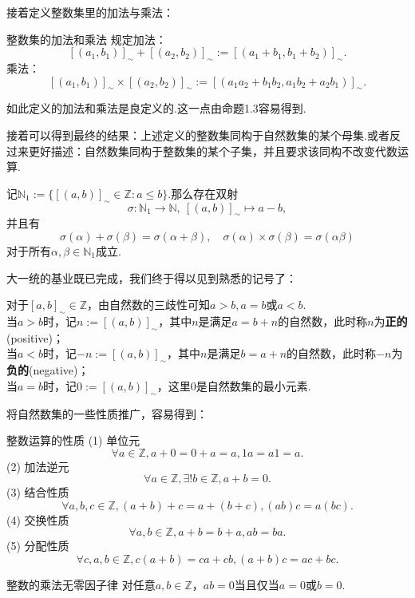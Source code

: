 \documentclass[lang=cn, zihao=5]{elegantbook}
\newcommand{\Z}{\mathbb{Z}}
\begin{document}
接着定义整数集里的加法与乘法：

\begin{definition}{整数集的加法和乘法}
	规定加法：$$[(a_1,b_1)]_{\sim} + [(a_2,b_2)]_{\sim} := [(a_1+b_1,b_1+b_2)]_{\sim}.$$
	乘法：
	$$[(a_1,b_1)]_{\sim} \times [(a_2,b_2)]_{\sim} := [(a_1a_2+b_1b_2,a_1b_2+a_2b_1)]_{\sim}.$$
\end{definition}

如此定义的加法和乘法是良定义的.这一点由命题1.3容易得到.

接着可以得到最终的结果：上述定义的整数集同构于自然数集的某个母集.或者反过来更好描述：自然数集同构于整数集的某个子集，并且要求该同构不改变代数运算.

\begin{proposition}
	记$\mathbb{N}_1:=\{ [(a,b)]_{\sim} \in \mathbb{Z}:a \leq b \}$.那么存在双射$$\sigma :\mathbb{N}_1 \to \mathbb{N},~[(a,b)]_{\sim} \mapsto a-b,$$
	并且有$$\sigma (\alpha) + \sigma (\beta) = \sigma (\alpha + \beta),\quad \sigma (\alpha) \times \sigma (\beta) = \sigma (\alpha  \beta)$$
	对于所有$\alpha ,\beta \in \mathbb{N}_1$成立.
\end{proposition}

大一统的基业既已完成，我们终于得以见到熟悉的记号了：

\begin{definition}
	对于$[a,b]_{\sim} \in \mathbb{Z}$，由自然数的三歧性可知$a>b,a=b$或$a<b$. \\
	当$a>b$时，记$n:=[(a,b)]_{\sim}$，其中$n$是满足$a=b+n$的自然数，此时称$n$为\textbf{正的}(positive)； \\
	当$a<b$时，记$-n:=[(a,b)]_{\sim}$，其中$n$是满足$b=a+n$的自然数，此时称$-n$为\textbf{负的}(negative)； \\
	当$a=b$时，记$0:=[(a,b)]_{\sim}$，这里$0$是自然数集的最小元素.
\end{definition}

将自然数集的一些性质推广，容易得到：

\begin{proposition}{整数运算的性质}
	(1) 单位元$$\forall a \in \Z , a + 0 = 0+ a = a , 1 a = a 1 = a .$$
	(2) 加法逆元$$\forall a \in \Z , \exists ! b \in \Z , a + b = 0 .$$
	(3) 结合性质$$\forall a , b , c \in \Z , (a + b) + c = a + (b + c) , (a b) c = a (b c) .$$
	(4) 交换性质$$\forall a , b \in \Z , a + b = b + a , a b = b a .$$
	(5) 分配性质$$\forall c , a , b \in \Z , c (a + b) = c a + c b,(a+b)c=ac+bc .$$
\end{proposition}

\begin{proposition}{整数的乘法无零因子律}
	对任意$a,b \in \Z$，$ab=0$当且仅当$a=0$或$b=0$.
\end{proposition}
\end{document}
